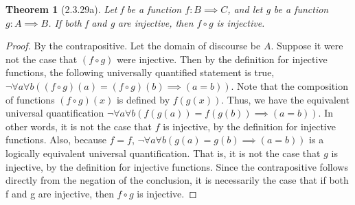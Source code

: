 \documentclass[a4paper, 12pt]{article}
\theoremstyle{plain}
\newtheorem*{theorem*}{Theorem}
\begin{document}
	
	\begin{theorem*}[2.3.29a]
		Let f be a function $f: B \implies C$, and let g be a function $g: A \implies B$. If both 
		f and g are injective, then $f \circ g$ is injective.
	\end{theorem*}
	
	\begin{proof}
		By the contrapositive. Let the domain of discourse be $A$. 
		\newline Suppose it were not the case that $(f \circ g)$ were injective. Then by the 
		\newline definition for injective functions, the following universally quantified 
		\newline statement is true, 
		$\lnot \forall a \forall b ((f \circ g)(a) = (f \circ g)(b) \implies (a = b))$. Note that 
		the composition of functions $(f \circ g)(x)$ is defined by $f(g(x))$. Thus, we have the 
		equivalent universal quantification 
		$\lnot \forall a \forall b (f(g(a)) = f(g(b)) \implies (a = b))$. In other words, it is not 
		the case that $f$ is injective, by the definition for injective functions. Also, because 
		$f = f$, $\lnot \forall a \forall b (g(a) = g(b) \implies (a = b))$ is a logically 
		equivalent universal quantification. That is, it is not the case that $g$ is injective, by the 
		definition for injective functions. Since the contrapositive follows directly from the negation 
		of the conclusion, it is necessarily the case that if both f and g are injective, then 
		$f \circ g$ is injective.
	\end{proof}
\end{document}
